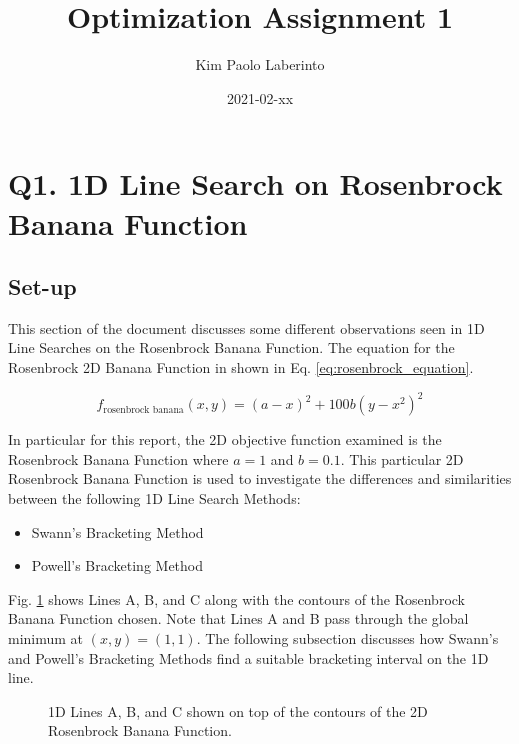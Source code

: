 \documentclass{article}
\title{Optimization Assignment 1}
\date{2021-02-xx}
\author{Kim Paolo Laberinto}
\begin{document}
    \maketitle
    \newpage

    \tableofcontents
    \newpage

    \section{Q1. 1D Line Search on Rosenbrock Banana Function}

    \subsection{Set-up}

    This section of the document discusses some different observations seen in 1D Line Searches on the Rosenbrock Banana Function.
    The equation for the Rosenbrock 2D Banana Function in shown in Eq. \ref{eq:rosenbrock_equation}. 
    
    \begin{equation} \label{eq:rosenbrock_equation}
        f_{\text{rosenbrock banana}}(x, y) = (a - x)^2 + 100b(y-x^2)^2
    \end{equation}
    
    In particular for this report, the 2D objective function examined is the Rosenbrock Banana Function where $a = 1$ and $b = 0.1$. 
    This particular 2D Rosenbrock Banana Function is used to investigate the differences and similarities between the following 1D Line Search Methods:
    \begin{itemize}
        \item Swann's Bracketing Method
        \item Powell's Bracketing Method
    \end{itemize}

    Fig. \ref{fig:AllLinesPlot} shows Lines A, B, and C along with the contours of the Rosenbrock Banana Function chosen. 
    Note that Lines A and B pass through the global minimum at $(x, y) = (1, 1)$. 
    The following subsection discusses how Swann's and Powell's Bracketing Methods find a suitable bracketing interval on the 1D line.

    \begin{figure}[H]
        \centering
        
        \caption{1D Lines A, B, and C shown on top of the contours of the 2D Rosenbrock Banana Function.}
        \label{fig:AllLinesPlot}
    \end{figure}
\end{document}
